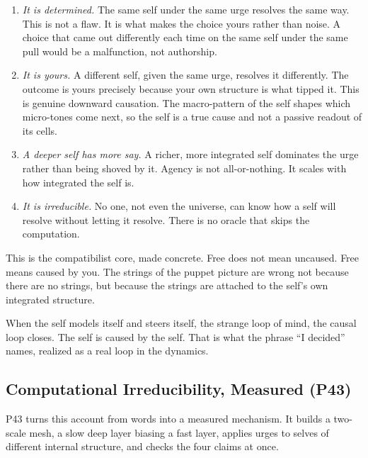 \begin{enumerate}
\item \emph{It is determined.} The same self under the same urge resolves the same way. This is not a flaw. It is what makes the choice yours rather than noise. A choice that came out differently each time on the same self under the same pull would be a malfunction, not authorship.
\item \emph{It is yours.} A different self, given the same urge, resolves it differently. The outcome is yours precisely because your own structure is what tipped it. This is genuine downward causation. The macro-pattern of the self shapes which micro-tones come next, so the self is a true cause and not a passive readout of its cells.
\item \emph{A deeper self has more say.} A richer, more integrated self dominates the urge rather than being shoved by it. Agency is not all-or-nothing. It scales with how integrated the self is.
\item \emph{It is irreducible.} No one, not even the universe, can know how a self will resolve without letting it resolve. There is no oracle that skips the computation.
\end{enumerate}

This is the compatibilist core, made concrete. Free does not mean uncaused. Free means caused by you. The strings of the puppet picture are wrong not because there are no strings, but because the strings are attached to the self's own integrated structure.

When the self models itself and steers itself, the strange loop of mind, the causal loop closes. The self is caused by the self. That is what the phrase ``I decided'' names, realized as a real loop in the dynamics.

\subsection{Computational Irreducibility, Measured (P43)}

P43 turns this account from words into a measured mechanism. It builds a two-scale mesh, a slow deep layer biasing a fast layer, applies urges to selves of different internal structure, and checks the four claims at once.

